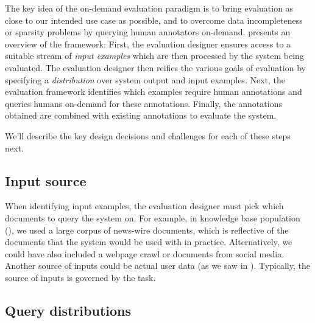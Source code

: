 
The key idea of the on-demand evaluation paradigm is to bring evaluation as close to our intended use case as possible, and to overcome data incompleteness or sparsity problems by querying human annotators on-demand.
 presents an overview of the framework: 
First, the evaluation designer ensures access to a suitable stream of \textit{input examples}
which are then processed by the system being evaluated.
The evaluation designer then reifies  the various goals of evaluation by specifying a \textit{distribution} over system output and input examples.
Next, the evaluation framework identifies which examples require human annotations and queries humans on-demand for these annotations. 
Finally, the annotations obtained are combined with existing annotations to evaluate the system.

We'll describe the key design decisions and challenges for each of these steps next.

\subsection{Input source}

When identifying input examples, the evaluation designer must pick which documents to query the system on.
For example, in knowledge base population (), we used a large corpus of news-wire documents, which is reflective of the documents that the system would be used with in practice.
Alternatively, we could have also included a webpage crawl or documents from social media.
Another source of inputs could be actual user data (as we saw in ).
Typically, the source of inputs is governed by the task.

\subsection{Query distributions}



